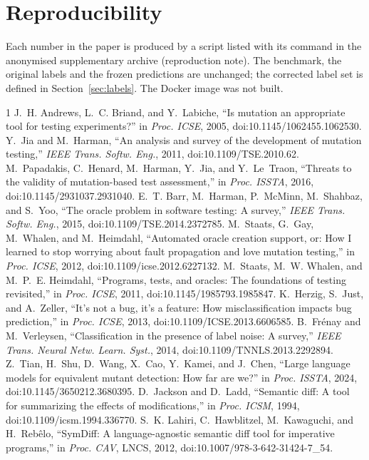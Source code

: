 \documentclass[conference]{IEEEtran}
\begin{document}
\section*{Reproducibility}
Each number in the paper is produced by a script listed with its command in the anonymised supplementary archive (reproduction note). The benchmark, the original labels and the frozen predictions are unchanged; the corrected label set is defined in Section~\ref{sec:labels}. The Docker image was not built.

\begin{thebibliography}{1}
 J.~H. Andrews, L.~C. Briand, and Y.~Labiche, ``Is mutation an appropriate tool for testing experiments?'' in \emph{Proc. ICSE}, 2005, doi:10.1145/1062455.1062530.
 Y.~Jia and M.~Harman, ``An analysis and survey of the development of mutation testing,'' \emph{IEEE Trans. Softw. Eng.}, 2011, doi:10.1109/TSE.2010.62.
 M.~Papadakis, C.~Henard, M.~Harman, Y.~Jia, and Y.~Le~Traon, ``Threats to the validity of mutation-based test assessment,'' in \emph{Proc. ISSTA}, 2016, doi:10.1145/2931037.2931040.
 E.~T. Barr, M.~Harman, P.~McMinn, M.~Shahbaz, and S.~Yoo, ``The oracle problem in software testing: A survey,'' \emph{IEEE Trans. Softw. Eng.}, 2015, doi:10.1109/TSE.2014.2372785.
 M.~Staats, G.~Gay, M.~Whalen, and M.~Heimdahl, ``Automated oracle creation support, or: How I learned to stop worrying about fault propagation and love mutation testing,'' in \emph{Proc. ICSE}, 2012, doi:10.1109/icse.2012.6227132.
 M.~Staats, M.~W. Whalen, and M.~P.~E. Heimdahl, ``Programs, tests, and oracles: The foundations of testing revisited,'' in \emph{Proc. ICSE}, 2011, doi:10.1145/1985793.1985847.
 K.~Herzig, S.~Just, and A.~Zeller, ``It's not a bug, it's a feature: How misclassification impacts bug prediction,'' in \emph{Proc. ICSE}, 2013, doi:10.1109/ICSE.2013.6606585.
 B.~Fr\'enay and M.~Verleysen, ``Classification in the presence of label noise: A survey,'' \emph{IEEE Trans. Neural Netw. Learn. Syst.}, 2014, doi:10.1109/TNNLS.2013.2292894.
 Z.~Tian, H.~Shu, D.~Wang, X.~Cao, Y.~Kamei, and J.~Chen, ``Large language models for equivalent mutant detection: How far are we?'' in \emph{Proc. ISSTA}, 2024, doi:10.1145/3650212.3680395.
 D.~Jackson and D.~Ladd, ``Semantic diff: A tool for summarizing the effects of modifications,'' in \emph{Proc. ICSM}, 1994, doi:10.1109/icsm.1994.336770.
 S.~K. Lahiri, C.~Hawblitzel, M.~Kawaguchi, and H.~Reb\^elo, ``SymDiff: A language-agnostic semantic diff tool for imperative programs,'' in \emph{Proc. CAV}, LNCS, 2012, doi:10.1007/978-3-642-31424-7\_54.

\end{thebibliography}
\end{document}
